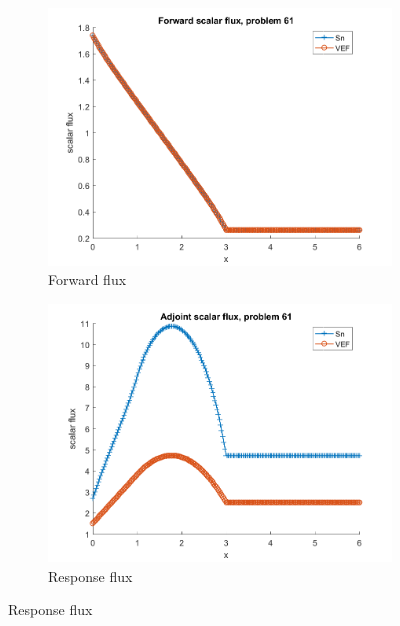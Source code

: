 \documentclass{article}
\begin{document}
\begin{figure}[H]
\label{Case61Flux}
\centering
\begin{subfigure}{.5\textwidth}
  \centering
  \includegraphics[width=.98\linewidth]{IanProposal/figures2/61phi.png}
  \caption{Forward flux}
  \label{fig:sfig1}
\end{subfigure}%
\begin{subfigure}{.5\textwidth}
  \centering
  \includegraphics[width=.98\linewidth]{IanProposal/figures2/61phia.png}
  \caption{Response flux}
  \label{fig:sfig4}
\end{subfigure}%
\end{figure}
\end{document}
